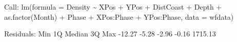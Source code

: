 \documentclass[
  oneside]{krantz}
\newenvironment{Shaded}{\begin{snugshade}}{\end{snugshade}}
\newcommand{\AttributeTok}[1]{\textcolor[rgb]{0.77,0.63,0.00}{#1}}
\newcommand{\FloatTok}[1]{\textcolor[rgb]{0.00,0.00,0.81}{#1}}
\newcommand{\FunctionTok}[1]{\textcolor[rgb]{0.00,0.00,0.00}{#1}}
\newcommand{\NormalTok}[1]{#1}
\newcommand{\SpecialCharTok}[1]{\textcolor[rgb]{0.00,0.00,0.00}{#1}}
\begin{document}
\begin{Shaded}
\begin{Highlighting}[]
\NormalTok{Call}\SpecialCharTok{:}
\FunctionTok{lm}\NormalTok{(}\AttributeTok{formula =}\NormalTok{ Density }\SpecialCharTok{\textasciitilde{}}\NormalTok{ XPos }\SpecialCharTok{+}\NormalTok{ YPos }\SpecialCharTok{+}\NormalTok{ DistCoast }\SpecialCharTok{+}\NormalTok{ Depth }\SpecialCharTok{+} \FunctionTok{as.factor}\NormalTok{(Month) }\SpecialCharTok{+} 
\NormalTok{    Phase }\SpecialCharTok{+}\NormalTok{ XPos}\SpecialCharTok{:}\NormalTok{Phase }\SpecialCharTok{+}\NormalTok{ YPos}\SpecialCharTok{:}\NormalTok{Phase, }\AttributeTok{data =}\NormalTok{ wfdata)}

\NormalTok{Residuals}\SpecialCharTok{:}
\NormalTok{    Min      1Q  Median      3Q     Max }
 \SpecialCharTok{{-}}\FloatTok{12.27}   \SpecialCharTok{{-}}\FloatTok{5.28}   \SpecialCharTok{{-}}\FloatTok{2.96}   \SpecialCharTok{{-}}\FloatTok{0.16} \FloatTok{1715.13} 


\end{Highlighting}
\end{Shaded}
\end{document}
